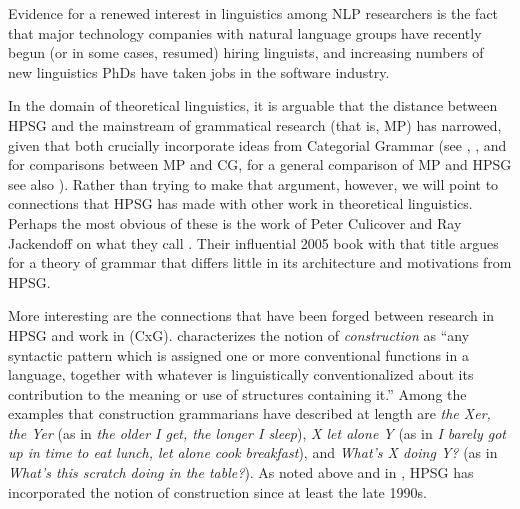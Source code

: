 \documentclass[output=paper
 	        ,biblatex
                ,babelshorthands
                ,newtxmath
                ,draftmode
                ,colorlinks, citecolor=brown
]{langscibook}
\begin{document}
Evidence for a renewed interest in linguistics among NLP researchers is the fact that major technology companies with natural language groups have recently begun (or in some cases, resumed) hiring linguists, and increasing numbers of new linguistics PhDs have taken jobs in the software industry.  

In the domain of theoretical linguistics, it is arguable that the distance between HPSG and the mainstream of grammatical research (that is, MP) has narrowed, given that both crucially incorporate ideas from Categorial Grammar (see \citealt{RetStab2004}, \citealt{BE95a}, and \citealt{MuellerUnifying} for comparisons between MP and CG, for a general comparison of MP and HPSG see also ). Rather than trying to make that argument, however, we will point to connections that HPSG has made with other work in theoretical linguistics.  Perhaps the most obvious of these is the work of Peter Culicover and Ray Jackendoff on what they call {\em{}}.  Their influential 2005 book with that title \citep{CJ2005a} argues for a theory of grammar that differs little in its architecture and motivations from HPSG. 

More interesting are the connections that have been forged between research in HPSG and work in  (CxG).  \citet[]{Fillmore88a} characterizes the notion  of \emph{construction} as ``any syntactic pattern which is assigned one or more conventional functions in a language, together with whatever is linguistically conventionalized about its contribution to the meaning or use of structures containing it.''  Among the examples that construction grammarians have described at length are \emph{the Xer, the Yer} (as in \emph{the older I get, the longer I sleep}), \emph{X let alone Y} (as in \emph{I barely got up in time to eat lunch, let alone cook breakfast}), and \emph{What's X doing Y?} (as in \emph{What's this scratch doing in the table?}).  As noted above and in \crossrefchaptert[\page \pageref{page-HPSG-always-was-constructional}, \pageref{cxg:page-HPSG-inheritance}]{cxg}, HPSG has incorporated the notion of construction since at least the late 1990s.  
\end{document}

